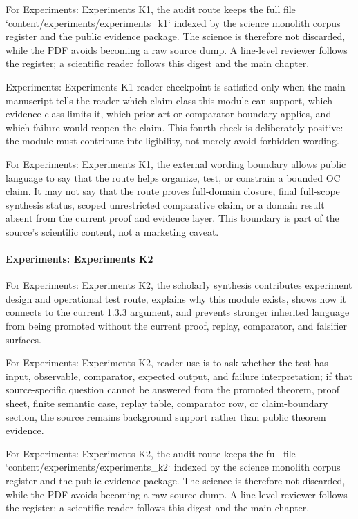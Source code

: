 For Experiments: Experiments K1, the audit route keeps the full file `content/experiments/experiments\_k1` indexed by the science monolith corpus register and the public evidence package. The science is therefore not discarded, while the PDF avoids becoming a raw source dump. A line-level reviewer follows the register; a scientific reader follows this digest and the main chapter.


Experiments: Experiments K1 reader checkpoint is satisfied only when the main manuscript tells the reader which claim class this module can support, which evidence class limits it, which prior-art or comparator boundary applies, and which failure would reopen the claim. This fourth check is deliberately positive: the module must contribute intelligibility, not merely avoid forbidden wording.


For Experiments: Experiments K1, the external wording boundary allows public language to say that the route helps organize, test, or constrain a bounded OC claim. It may not say that the route proves full-domain closure, final full-scope synthesis status, scoped unrestricted comparative claim, or a domain result absent from the current proof and evidence layer. This boundary is part of the source's scientific content, not a marketing caveat.


\paragraph{Experiments: Experiments K2}

For Experiments: Experiments K2, the scholarly synthesis contributes experiment design and operational test route, explains why this module exists, shows how it connects to the current 1.3.3 argument, and prevents stronger inherited language from being promoted without the current proof, replay, comparator, and falsifier surfaces.


For Experiments: Experiments K2, reader use is to ask whether the test has input, observable, comparator, expected output, and failure interpretation; if that source-specific question cannot be answered from the promoted theorem, proof sheet, finite semantic case, replay table, comparator row, or claim-boundary section, the source remains background support rather than public theorem evidence.


For Experiments: Experiments K2, the audit route keeps the full file `content/experiments/experiments\_k2` indexed by the science monolith corpus register and the public evidence package. The science is therefore not discarded, while the PDF avoids becoming a raw source dump. A line-level reviewer follows the register; a scientific reader follows this digest and the main chapter.


